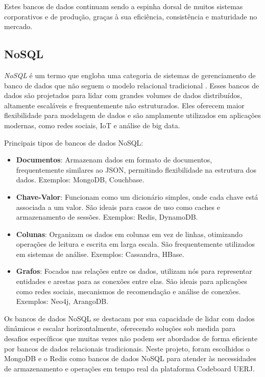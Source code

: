 Estes bancos de dados continuam sendo a espinha dorsal de muitos sistemas corporativos e de produção, graças à sua eficiência, consistência e maturidade no mercado.

\subsection{NoSQL}


\emph{NoSQL} é um termo que engloba uma categoria de sistemas de gerenciamento de banco de dados que não seguem o modelo relacional tradicional \cite{nosql-vs-sql}. Esses bancos de dados são projetados para lidar com grandes volumes de dados distribuídos, altamente escaláveis e frequentemente não estruturados. Eles oferecem maior flexibilidade para modelagem de dados e são amplamente utilizados em aplicações modernas, como redes sociais, IoT e análise de big data.

Principais tipos de bancos de dados NoSQL:

\begin{itemize}
    \item \textbf{Documentos}: Armazenam dados em formato de documentos, frequentemente similares ao JSON, permitindo flexibilidade na estrutura dos dados. Exemplos: MongoDB, Couchbase.
    \item \textbf{Chave-Valor}: Funcionam como um dicionário simples, onde cada chave está associada a um valor. São ideais para casos de uso como caches e armazenamento de sessões. Exemplos: Redis, DynamoDB.
    \item \textbf{Colunas}: Organizam os dados em colunas em vez de linhas, otimizando operações de leitura e escrita em larga escala. São frequentemente utilizados em sistemas de análise. Exemplos: Cassandra, HBase.
    \item \textbf{Grafos}: Focados nas relações entre os dados, utilizam nós para representar entidades e arestas para as conexões entre elas. São ideais para aplicações como redes sociais, mecanismos de recomendação e análise de conexões. Exemplos: Neo4j, ArangoDB.
\end{itemize}

Os bancos de dados NoSQL se destacam por sua capacidade de lidar com dados dinâmicos e escalar horizontalmente, oferecendo soluções sob medida para desafios específicos que muitas vezes não podem ser abordados de forma eficiente por bancos de dados relacionais tradicionais. Neste projeto, foram escolhidos o MongoDB e o Redis como bancos de dados NoSQL para atender às necessidades de armazenamento e operações em tempo real da plataforma Codeboard UERJ.

